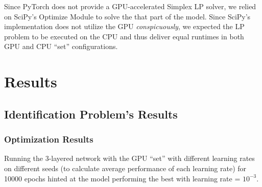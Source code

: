\documentclass[12pt]{article}
\begin{document}
    Since PyTorch does not provide a GPU-accelerated Simplex LP solver, we relied on SciPy's Optimize Module to solve the that part of the model. Since SciPy's implementation does not utilize the GPU \textit{conspicuously}, we expected the LP problem to be executed on the CPU and thus deliver equal runtimes in both GPU and CPU ``set'' configurations.
    
    \section{Results} \label{sec:Results}
    \subsection{Identification Problem's Results} \label{sec:Identification Problem's Results}
    \subsubsection{Optimization Results} \label{sec:IdProbRes - Optimization}
    Running the 3-layered network with the GPU ``set'' with different learning rates on different seeds (to calculate average performance of each learning rate) for 10000 epochs hinted at the model performing the best with learning rate = $10^{-3}$. 
    
\end{document}
